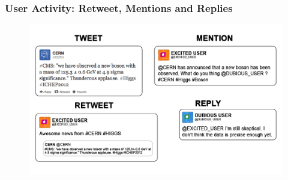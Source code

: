 \documentclass{beamer}
\begin{document}
\begin{frame}
\frametitle{User Activity: Retweet, Mentions and Replies}
\begin{figure}
\includegraphics[width=1\linewidth]{figures/tweets/reply}
\end{figure}
\end{frame}

\end{document}
